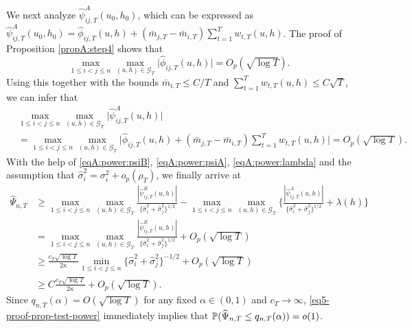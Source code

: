 We next analyze $\widehat{\psi}^A_{ij,T}(u_0,h_0)$, which can be expressed as $\widehat{\psi}^A_{ij,T}(u_0,h_0) = \widehat\phi_{ij,T}(u, h) + (\bar{m}_{j, T} - \bar{m}_{i, T}) \sum_{t=1}^T w_{t, T}(u, h)$. The proof of Proposition \ref{propA:step4} shows that 
\begin{equation*}
\max_{1 \le i < j \le n} \max_{(u,h) \in \mathcal{G}_T} \Big| \widehat{\phi}_{ij, T}(u,h) \Big| = O_p(\sqrt{\log T}). 
\end{equation*}
Using this together with the bounds $\bar{m}_{i, T} \le C/T$ and $\sum_{t=1}^T w_{t, T}(u, h) \le C \sqrt{T}$, we can infer that 
\begin{align} 
 & \max_{1 \le i < j \le n} \max_{(u,h) \in \mathcal{G}_T} \Big| \widehat\psi_{ij,T}^A(u, h) \Big| \nonumber \\[-0.2cm]
 & = \max_{1 \le i < j \le n} \max_{(u,h) \in \mathcal{G}_T} \Big| \widehat\phi_{ij,T}(u, h) + (\bar{m}_{j, T} - \bar{m}_{i, T}) \sum_{t=1}^T w_{t, T}(u, h) \Big| = O_p(\sqrt{\log T}). \label{eqA:power:psiA}
\end{align}
With the help of \eqref{eqA:power:psiB}, \eqref{eqA:power:psiA}, \eqref{eqA:power:lambda} and the assumption that $\widehat{\sigma}^2_i = \sigma^2_i + o_p(\rho_T)$, we finally arrive at 
\begin{align}
\widehat{\Psi}_{n, T}  
 & \ge \max_{1 \le i < j \le n} \max_{(u,h) \in \mathcal{G}_T} \frac{|\widehat{\psi}_{ij, T}^B(u,h)|}{\{\widehat{\sigma}_i^2 + \widehat{\sigma}_j^2\}^{1/2}} - \max_{1 \le i < j \le n} \max_{(u,h) \in \mathcal{G}_T} \bigg\{ \frac{|\widehat{\psi}_{ij, T}^A(u,h)|}{\{\widehat{\sigma}^2_i + \widehat{\sigma}_j^2\}^{1/2}} + \lambda(h) \bigg\} \nonumber \\
 & = \max_{1 \le i < j \le n} \max_{(u,h) \in \mathcal{G}_T} \frac{|\widehat{\psi}_{ij, T}^B(u,h)|}{\{\widehat{\sigma}_i^2 + \widehat{\sigma}_j^2\}^{1/2}} + O_p(\sqrt{\log T}) \nonumber \\
 & \ge \frac{c_T \sqrt{\log T}}{2 \kappa} \min_{1 \le i < j \le n}\{\widehat{\sigma}_i^2 + \widehat{\sigma}_j^2\}^{-1/2} + O_p(\sqrt{\log T}) \nonumber \\
 & \ge C\frac{c_T \sqrt{\log T}}{2 \kappa} + O_p(\sqrt{\log T}). \label{eq5-proof-prop-test-power}
\end{align}
Since $q_{n, T}(\alpha) = O(\sqrt{\log T})$ for any fixed $\alpha \in (0,1)$ and $c_T \to \infty$, \eqref{eq5-proof-prop-test-power} immediately implies that $\mathbb{P}(\widehat{\Psi}_{n, T} \le q_{n, T}(\alpha)) = o(1)$. 



